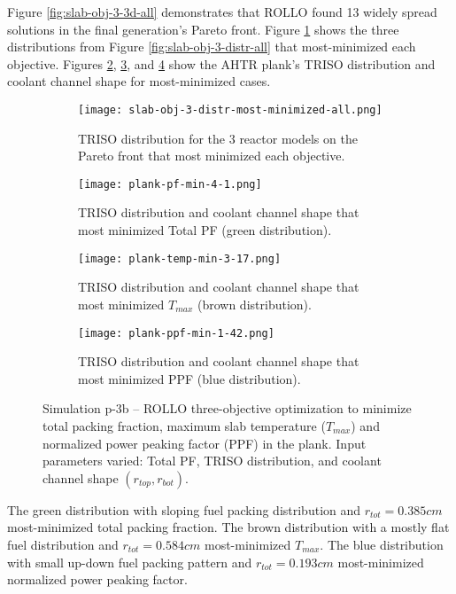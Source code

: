 Figure \ref{fig:slab-obj-3-3d-all} demonstrates that \gls{ROLLO} found 13 widely spread 
solutions in the final generation's Pareto front. 
Figure \ref{fig:slab-obj-3-distr-most-minimized-distr-all} shows the three distributions 
from Figure \ref{fig:slab-obj-3-distr-all} that most-minimized each objective. 
Figures \ref{fig:slab-obj-3-distr-most-minimized-pf-all}, \ref{fig:slab-obj-3-distr-most-minimized-temp-all}, 
and \ref{fig:slab-obj-3-distr-most-minimized-ppf-all} show the \gls{AHTR} plank's TRISO 
distribution and coolant channel shape for most-minimized cases. 
\begin{figure}[htbp!]
    \begin{subfigure}{\textwidth}
        \texttt{[image: slab-obj-3-distr-most-minimized-all.png]}
        \caption{TRISO distribution for the 3 reactor models on the Pareto 
        front that most minimized each objective.}
        \label{fig:slab-obj-3-distr-most-minimized-distr-all}
    \end{subfigure}
    \begin{subfigure}{\textwidth}
        \texttt{[image: plank-pf-min-4-1.png]}
        \caption{TRISO distribution and coolant channel shape that most minimized Total 
        PF (green distribution).}
        \label{fig:slab-obj-3-distr-most-minimized-pf-all}
    \end{subfigure}
    \begin{subfigure}{\textwidth}
        \texttt{[image: plank-temp-min-3-17.png]}
        \caption{TRISO distribution and coolant channel shape that most minimized 
        $T_{max}$ (brown distribution).}
        \label{fig:slab-obj-3-distr-most-minimized-temp-all}
    \end{subfigure}
    \begin{subfigure}{\textwidth}
        \texttt{[image: plank-ppf-min-1-42.png]}
        \caption{TRISO distribution and coolant channel shape that most minimized PPF
        (blue distribution).}
        \label{fig:slab-obj-3-distr-most-minimized-ppf-all}
    \end{subfigure}
    \caption{Simulation p-3b -- ROLLO three-objective optimization to minimize total 
    packing fraction, maximum slab temperature ($T_{max}$) and normalized power peaking 
    factor (PPF) in the plank. 
    Input parameters varied: Total PF, TRISO distribution, and coolant channel shape 
    $(r_{top}, r_{bot})$.}
    \label{fig:slab-obj-3-distr-most-minimized-all}
\end{figure}
The green distribution with sloping fuel packing distribution and $r_{tot} = 0.385cm$ 
most-minimized total packing fraction. 
The brown distribution with a mostly flat fuel distribution and $r_{tot} = 0.584cm$ 
most-minimized $T_{max}$. 
The blue distribution with small up-down fuel packing pattern and $r_{tot} = 0.193cm$ 
most-minimized normalized power peaking factor. 

